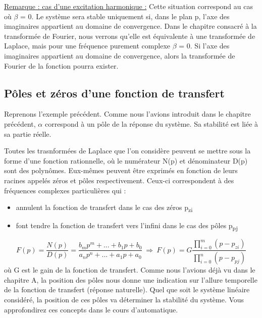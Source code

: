\documentclass[]{book}
\begin{document}
{	\underline{Remarque : cas d'une excitation harmonique :}
	Cette situation correspond au cas où $\beta $ = 0. Le système sera stable
	uniquement si, dans le plan p, l'axe des imaginaires appartient au
	domaine de convergence. Dans le chapitre consacré à la transformée de
	Fourier, nous verrons qu'elle est équivalente à une transformée de
	Laplace, mais pour une fréquence purement complexe $\beta $ = 0. Si l'axe des
	imaginaires appartient au domaine de convergence, alors la transformée
	de Fourier de la fonction pourra exister.
	
	\subsection{Pôles et zéros d'une fonction de transfert}
	
	Reprenons l'exemple précédent. Comme nous l'avions introduit dans le
	chapitre précédent, $\alpha $ correspond à un pôle de la réponse du système. Sa
	stabilité est liée à sa partie réelle.~
	
	Toutes les trasnformées de Laplace que l'on considère peuvent se mettre sous la forme d'une
	fonction rationnelle, où le numérateur N(p) et dénominateur D(p) sont
	des polynômes. Eux-mêmes peuvent être exprimés en fonction de leurs
	racines appelés zéros et pôles respectivement. Ceux-ci correspondent à
	des fréquences complexes particulières qui :
	\begin{itemize}
		\item annulent la fonction de transfert dans le cas des zéros p\textsubscript{zi}
	
		\item font tendre la fonction de transfert vers l'infini dans le cas des pôles p\textsubscript{pj}
	\end{itemize}
	
	\begin{equation}\label{key}
	F(p) = \frac{N(p)}{D(p)} = \frac{b_{m}p^{m}+...+b_{1}p+b_{0}}{a_{n}p^{n}+...+a_{1}p+a_{0}} ~\Rightarrow ~ F(p) = G \frac{\prod_{i=0}^{m}(p-p_{zi})}{\prod_{i=0}^{n}(p-p_{pj})}
	\end{equation}
	où G est le gain de la fonction de transfert.
	Comme nous l'avions déjà vu dans le chapitre A, la position des pôles nous donne une indication sur l'allure temporelle de la fonction de transfert (réponse naturelle).
	Quel que soit le système linéaire considéré, la position de ces pôles va déterminer la stabilité du système. Vous approfondirez ces concepts dans le cours d'automatique.
	
}
\end{document}
